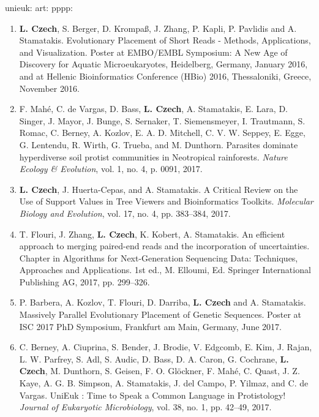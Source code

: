 unieuk: \cite{Berney2017}
art: \cite{Czech2018}
pppp: \cite{Czech2018a}


\begin{enumerate}
    \item \textbf{L. Czech}, S. Berger, D. Krompaß, J. Zhang, P. Kapli, P. Pavlidis and A. Stamatakis.
        Evolutionary Placement of Short Reads - Methods, Applications, and Visualization.
        Poster at EMBO/EMBL Symposium: A New Age of Discovery for Aquatic Microeukaryotes, Heidelberg, Germany, January 2016,
        and at Hellenic Bioinformatics Conference (HBio) 2016, Thessaloniki, Greece, November 2016.

    \item F. Mahé, C. de Vargas, D. Bass, \textbf{L. Czech}, A. Stamatakis, E. Lara, D. Singer, J. Mayor, J. Bunge,
        S. Sernaker, T. Siemensmeyer, I. Trautmann, S. Romac, C. Berney, A. Kozlov, E. A. D. Mitchell, C. V. W. Seppey,
        E. Egge, G. Lentendu, R. Wirth, G. Trueba, and M. Dunthorn.
        Parasites dominate hyperdiverse soil protist communities in Neotropical rainforests.
        \textit{Nature Ecology \& Evolution}, vol. 1, no. 4, p. 0091, 2017.

    \item \textbf{L. Czech}, J. Huerta-Cepas, and A. Stamatakis.
        A Critical Review on the Use of Support Values in Tree Viewers and Bioinformatics Toolkits.
        \textit{Molecular Biology and Evolution}, vol. 17, no. 4, pp. 383–384, 2017.

    \item T. Flouri, J. Zhang, \textbf{L. Czech}, K. Kobert, A. Stamatakis.
        An efficient approach to merging paired-end reads and the incorporation of uncertainties.
        Chapter in Algorithms for Next-Generation Sequencing Data: Techniques, Approaches and Applications.
        1st ed., M. Elloumi, Ed. Springer International Publishing AG, 2017, pp. 299–326.

    \item P. Barbera, A. Kozlov, T. Flouri, D. Darriba, \textbf{L. Czech} and A. Stamatakis.
        Massively Parallel Evolutionary Placement of Genetic Sequences.
        Poster at ISC 2017 PhD Symposium, Frankfurt am Main, Germany, June 2017.

    \item C. Berney, A. Ciuprina, S. Bender, J. Brodie, V. Edgcomb, E. Kim, J. Rajan, L. W. Parfrey, S. Adl, S. Audic,
        D. Bass, D. A. Caron, G. Cochrane, \textbf{L. Czech}, M. Dunthorn, S. Geisen, F. O. Glöckner, F. Mahé, C. Quast,
        J. Z. Kaye, A. G. B. Simpson, A. Stamatakis, J. del Campo, P. Yilmaz, and C. de Vargas.
        UniEuk : Time to Speak a Common Language in Protistology!
        \textit{Journal of Eukaryotic Microbiology}, vol. 38, no. 1, pp. 42–49, 2017.


\end{enumerate}
